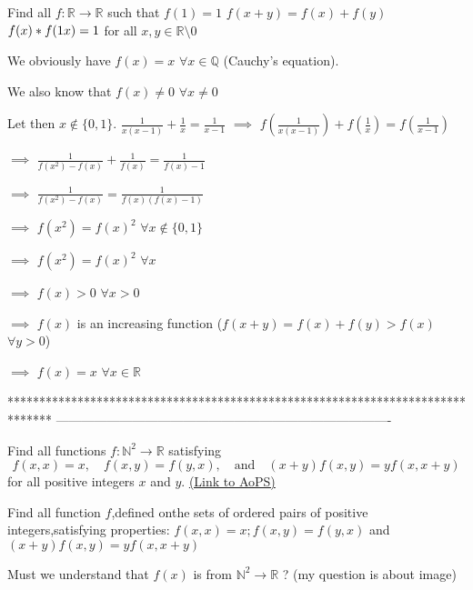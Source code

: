 \begin{solution}
	\begin{tcolorbox}Find all $ f: \mathbb{R} \rightarrow \mathbb{R}$ such that
$ f(1) = 1$
$ f(x + y) = f(x) + f(y)$
$ f(x)*f(1\/x) = 1$
for all $ x,y \in \mathbb{R} \setminus 0$\end{tcolorbox}

We obviously have $ f(x)=x$ $ \forall x\in\mathbb Q$ (Cauchy's equation).

We also know that $ f(x)\neq 0$ $ \forall x\neq 0$

Let then $ x\notin\{0,1\}$.
$ \frac{1}{x(x-1)}+\frac{1}{x}=\frac{1}{x-1}$ $ \implies$ $ f(\frac{1}{x(x-1)})+f(\frac{1}{x})=f(\frac{1}{x-1})$ 

$ \implies$ $ \frac{1}{f(x^2)-f(x)}+\frac{1}{f(x)}=\frac{1}{f(x)-1}$

$ \implies$ $ \frac{1}{f(x^2)-f(x)}=\frac{1}{f(x)(f(x)-1)}$

$ \implies$ $ f(x^2)=f(x)^2$ $ \forall x\notin\{0,1\}$

$ \implies$ $ f(x^2)=f(x)^2$ $ \forall x$

$ \implies$ $ f(x)>0$ $ \forall x>0$

$ \implies$ $ f(x)$ is an increasing function ($ f(x+y)=f(x)+f(y)>f(x)$ $ \forall y>0$)

$ \implies$ $ f(x)=x$ $ \forall x\in\mathbb R$
\end{solution}
*******************************************************************************
-------------------------------------------------------------------------------

\begin{problem}
	Find all functions $ f: \mathbb N^2 \to \mathbb R$ satisfying
\[f(x,x)=x, \quad  f(x,y)=f(y,x),\quad \text{and} \quad(x+y)f(x,y)=yf(x,x+y)\]
for all positive integers $x$ and $y$.
	\flushright \href{https://artofproblemsolving.com/community/c6h283367}{(Link to AoPS)}
\end{problem}



\begin{solution}
	\begin{tcolorbox}Find all function $ f$,defined onthe sets of ordered pairs of positive integers,satisfying properties:
 $ f(x,x) = x; f(x,y) = f(y,x)$ and $ (x + y)f(x,y) = yf(x,x + y)$\end{tcolorbox}

Must we understand that $ f(x)$ is from $ \mathbb N^2\to\mathbb R$ ? (my question is about image)
\end{solution}



